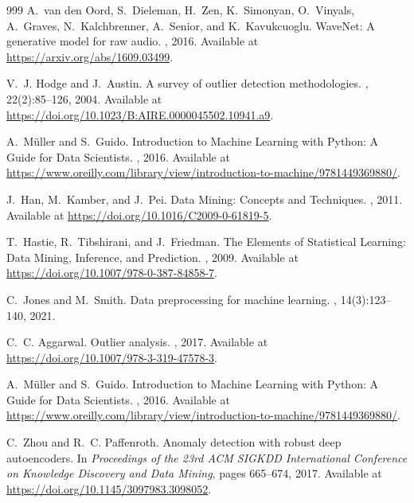 \documentclass[12pt, a4paper,twoside]{report}
\theoremstyle{plain} %
\theoremstyle{definition} %
\theoremstyle{remark} %
\numberwithin{equation}{chapter}
\begin{document}
\begin{thebibliography}{999}
A.~van den Oord, S.~Dieleman, H.~Zen, K.~Simonyan, O.~Vinyals, A.~Graves, N.~Kalchbrenner, A.~Senior, and K.~Kavukcuoglu.
\newblock WaveNet: A generative model for raw audio.
, 2016.
\newblock Available at \url{https://arxiv.org/abs/1609.03499}.

V.~J. Hodge and J.~Austin.
\newblock A survey of outlier detection methodologies.
, 22(2):85--126, 2004.
\newblock Available at \url{https://doi.org/10.1023/B:AIRE.0000045502.10941.a9}.


A.~Müller and S.~Guido.
\newblock Introduction to Machine Learning with Python: A Guide for Data Scientists.
, 2016.
\newblock Available at \url{https://www.oreilly.com/library/view/introduction-to-machine/9781449369880/}.

J.~Han, M.~Kamber, and J.~Pei.
\newblock Data Mining: Concepts and Techniques.
, 2011.
\newblock Available at \url{https://doi.org/10.1016/C2009-0-61819-5}.

T.~Hastie, R.~Tibshirani, and J.~Friedman.
\newblock The Elements of Statistical Learning: Data Mining, Inference, and Prediction.
, 2009.
\newblock Available at \url{https://doi.org/10.1007/978-0-387-84858-7}.


C.~Jones and M.~Smith.
\newblock Data preprocessing for machine learning.
, 14(3):123--140, 2021.

C.~C. Aggarwal.
\newblock Outlier analysis.
, 2017.
\newblock Available at \url{https://doi.org/10.1007/978-3-319-47578-3}.

A.~Müller and S.~Guido.
\newblock Introduction to Machine Learning with Python: A Guide for Data Scientists.
, 2016.
\newblock Available at \url{https://www.oreilly.com/library/view/introduction-to-machine/9781449369880/}.

C.~Zhou and R.~C. Paffenroth.
\newblock Anomaly detection with robust deep autoencoders.
\newblock In {\em Proceedings of the 23rd ACM SIGKDD International Conference on Knowledge Discovery and Data Mining}, pages 665--674, 2017.
\newblock Available at \url{https://doi.org/10.1145/3097983.3098052}.



\end{thebibliography}
\end{document}
